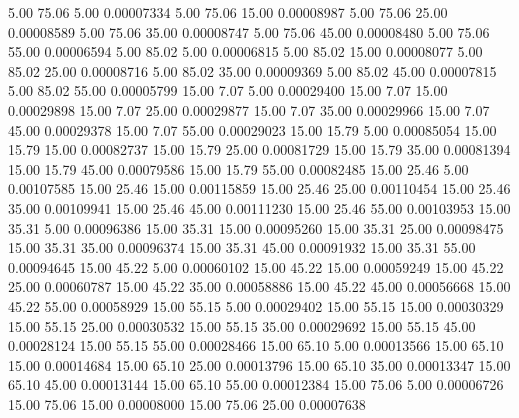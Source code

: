       5.00     75.06      5.00     0.00007334
      5.00     75.06     15.00     0.00008987
      5.00     75.06     25.00     0.00008589
      5.00     75.06     35.00     0.00008747
      5.00     75.06     45.00     0.00008480
      5.00     75.06     55.00     0.00006594
      5.00     85.02      5.00     0.00006815
      5.00     85.02     15.00     0.00008077
      5.00     85.02     25.00     0.00008716
      5.00     85.02     35.00     0.00009369
      5.00     85.02     45.00     0.00007815
      5.00     85.02     55.00     0.00005799
     15.00      7.07      5.00     0.00029400
     15.00      7.07     15.00     0.00029898
     15.00      7.07     25.00     0.00029877
     15.00      7.07     35.00     0.00029966
     15.00      7.07     45.00     0.00029378
     15.00      7.07     55.00     0.00029023
     15.00     15.79      5.00     0.00085054
     15.00     15.79     15.00     0.00082737
     15.00     15.79     25.00     0.00081729
     15.00     15.79     35.00     0.00081394
     15.00     15.79     45.00     0.00079586
     15.00     15.79     55.00     0.00082485
     15.00     25.46      5.00     0.00107585
     15.00     25.46     15.00     0.00115859
     15.00     25.46     25.00     0.00110454
     15.00     25.46     35.00     0.00109941
     15.00     25.46     45.00     0.00111230
     15.00     25.46     55.00     0.00103953
     15.00     35.31      5.00     0.00096386
     15.00     35.31     15.00     0.00095260
     15.00     35.31     25.00     0.00098475
     15.00     35.31     35.00     0.00096374
     15.00     35.31     45.00     0.00091932
     15.00     35.31     55.00     0.00094645
     15.00     45.22      5.00     0.00060102
     15.00     45.22     15.00     0.00059249
     15.00     45.22     25.00     0.00060787
     15.00     45.22     35.00     0.00058886
     15.00     45.22     45.00     0.00056668
     15.00     45.22     55.00     0.00058929
     15.00     55.15      5.00     0.00029402
     15.00     55.15     15.00     0.00030329
     15.00     55.15     25.00     0.00030532
     15.00     55.15     35.00     0.00029692
     15.00     55.15     45.00     0.00028124
     15.00     55.15     55.00     0.00028466
     15.00     65.10      5.00     0.00013566
     15.00     65.10     15.00     0.00014684
     15.00     65.10     25.00     0.00013796
     15.00     65.10     35.00     0.00013347
     15.00     65.10     45.00     0.00013144
     15.00     65.10     55.00     0.00012384
     15.00     75.06      5.00     0.00006726
     15.00     75.06     15.00     0.00008000
     15.00     75.06     25.00     0.00007638
